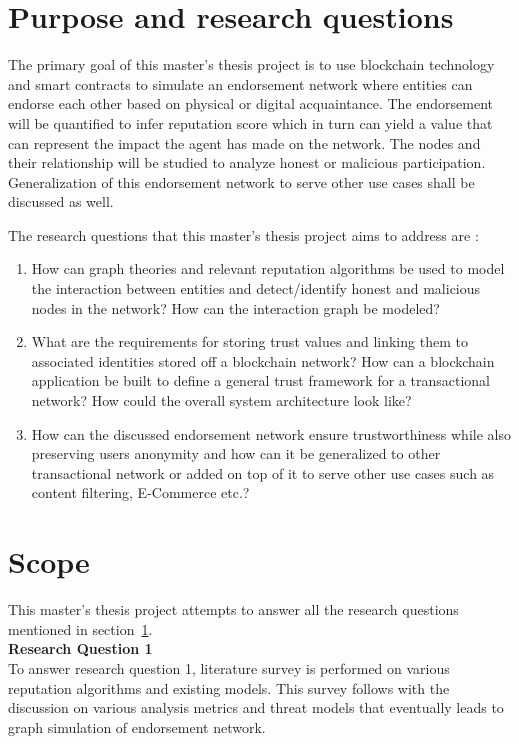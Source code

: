 
\section{Purpose and research questions} \label{ResearchQuestions}
The primary goal of this master's thesis project is to use blockchain technology
and smart contracts to simulate an endorsement network where entities can
endorse each other based on physical or digital acquaintance. The endorsement
will be quantified to infer reputation score which in turn can yield a value
that can represent the impact the agent has made on the network.  The nodes and
their relationship will be studied to analyze honest or malicious
participation.  Generalization of this endorsement network to serve other use
cases shall be discussed as well. 

The research questions that this master's thesis project aims to address are : 
\begin{enumerate}
		\item How can graph theories and relevant reputation algorithms be used
			to model the interaction between entities and detect/identify
			honest and malicious nodes in the network? How can the interaction
			graph be modeled? \label{question1}
		\item What are the requirements for storing trust values and linking
			them to associated identities stored off a blockchain network? How
			can a blockchain application be built to define a general trust
			framework for a transactional network? How could the overall system
			architecture look like? \label{question2} 
		\item How can the discussed endorsement network ensure trustworthiness
			while also preserving users anonymity and how can it be generalized
			to other transactional network or added on top of it to serve other
			use cases such as content filtering, E-Commerce
			etc.?\label{question3} 
\end{enumerate}

\section{Scope} 
This master's thesis project attempts to answer all the research questions mentioned
in section~\ref{ResearchQuestions}. \\
\textbf{Research Question 1}\\
To answer research question 1, literature survey is performed on various
reputation algorithms and existing models. This survey follows with the
discussion on various analysis metrics and threat models that eventually leads to
graph simulation of endorsement network.  

